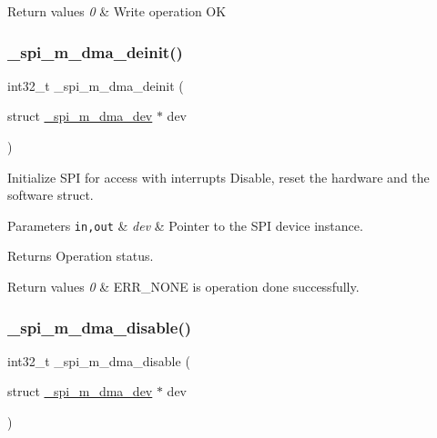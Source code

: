 \begin{DoxyRetVals}{Return values}
{\em 0} & Write operation OK \\
\hline
\end{DoxyRetVals}
\mbox{\label{group__hpl__spi_gabcbacc2873e0fa5a00620ca13f376ddd}} 
\subsubsection{\texorpdfstring{\+\_\+spi\+\_\+m\+\_\+dma\+\_\+deinit()}{\_spi\_m\_dma\_deinit()}}
{\footnotesize\ttfamily int32\+\_\+t \+\_\+spi\+\_\+m\+\_\+dma\+\_\+deinit (\begin{DoxyParamCaption}\item[{struct \hyperlink{group__hpl__spi_ga63a73aeb4b9cc78590635e10bb0b1e8b}{\+\_\+spi\+\_\+m\+\_\+dma\+\_\+dev} $\ast$}]{dev }\end{DoxyParamCaption})}



Initialize S\+PI for access with interrupts Disable, reset the hardware and the software struct. 


\begin{DoxyParams}[1]{Parameters}
\mbox{\tt in,out}  & {\em dev} & Pointer to the S\+PI device instance. \\
\hline
\end{DoxyParams}
\begin{DoxyReturn}{Returns}
Operation status. 
\end{DoxyReturn}

\begin{DoxyRetVals}{Return values}
{\em 0} & E\+R\+R\+\_\+\+N\+O\+NE is operation done successfully. \\
\hline
\end{DoxyRetVals}
\mbox{\label{group__hpl__spi_ga4923cdd8808adfcff6286c3a22680773}} 
\subsubsection{\texorpdfstring{\+\_\+spi\+\_\+m\+\_\+dma\+\_\+disable()}{\_spi\_m\_dma\_disable()}}
{\footnotesize\ttfamily int32\+\_\+t \+\_\+spi\+\_\+m\+\_\+dma\+\_\+disable (\begin{DoxyParamCaption}\item[{struct \hyperlink{group__hpl__spi_ga63a73aeb4b9cc78590635e10bb0b1e8b}{\+\_\+spi\+\_\+m\+\_\+dma\+\_\+dev} $\ast$}]{dev }\end{DoxyParamCaption})}




